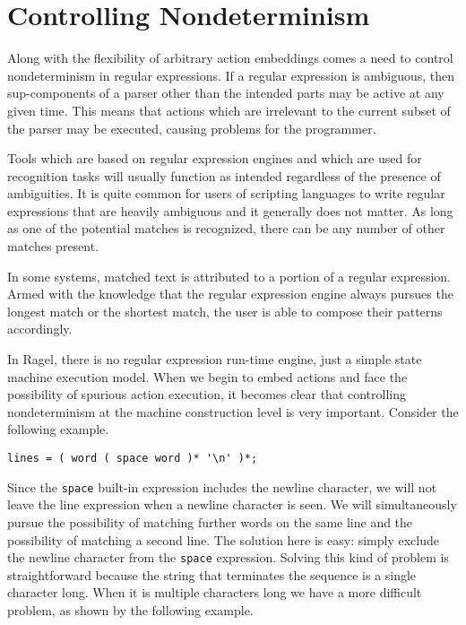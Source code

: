 \documentclass[letterpaper,11pt,oneside]{book}
\newcommand{\verbspace}{\vspace{10pt}}
\begin{document}
\chapter{Controlling Nondeterminism}
\label{controlling-nondeterminism}

Along with the flexibility of arbitrary action embeddings comes a need to
control nondeterminism in regular expressions. If a regular expression is
ambiguous, then sup-components of a parser other than the intended parts may be
active at any given time. This means that actions which are irrelevant to the
current subset of the parser may be executed, causing problems for the
programmer.

Tools which are based on regular expression engines and which are used for
recognition tasks will usually function as intended regardless of the presence
of ambiguities. It is quite common for users of scripting languages to write
regular expressions that are heavily ambiguous and it generally does not
matter. As long as one of the potential matches is recognized, there can be any
number of other matches present.

In some systems, matched text is attributed to a portion of a regular
expression. Armed with the knowledge that the regular expression engine always
pursues the longest match or the shortest match, the user is able to compose
their patterns accordingly.

In Ragel, there is no regular expression run-time engine, just a simple state
machine execution model. When we begin to embed actions and face the
possibility of spurious action execution, it becomes clear that controlling
nondeterminism at the machine construction level is very important. Consider
the following example.

\verbspace
\begin{verbatim}
lines = ( word ( space word )* '\n' )*;
\end{verbatim}
\verbspace

Since the \verb|space| built-in expression includes the newline character, we will
not leave the line expression when a newline character is seen. We will
simultaneously pursue the possibility of matching further words on the same
line and the possibility of matching a second line. The solution here is easy:
simply exclude the newline character from the \verb|space| expression. Solving
this kind of problem is straightforward because the string that terminates the
sequence is a single character long. When it is multiple characters long we
have a more difficult problem, as shown by the following example.
\end{document}
